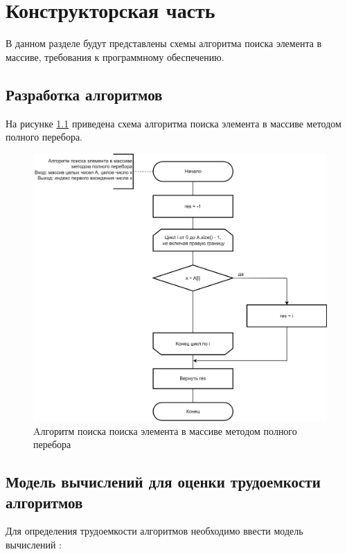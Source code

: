 \chapter{Конструкторская часть}

В данном разделе будут представлены схемы алгоритма поиска элемента в массиве, требования к программному обеспечению.

\section{Разработка алгоритмов}

На рисунке \ref{img:solution} приведена схема алгоритма поиска элемента в массиве методом полного перебора.

\begin{figure}[h]
	\begin{center}
		\includegraphics[scale=0.2]{img/solution.png}
	\end{center}
	\captionsetup{justification=centering}
	\caption{Aлгоритм поиска поиска элемента в массиве методом полного перебора}
	\label{img:solution}
\end{figure}
\clearpage
\section{Модель вычислений для оценки трудоемкости алгоритмов}

Для определения трудоемкости алгоритмов необходимо ввести модель вычислений \cite{alg1}:

